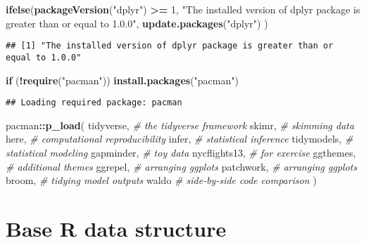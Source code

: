 \documentclass[
]{book}
\newenvironment{Shaded}{\begin{snugshade}}{\end{snugshade}}
\newcommand{\CommentTok}[1]{\textcolor[rgb]{0.56,0.35,0.01}{\textit{#1}}}
\newcommand{\ControlFlowTok}[1]{\textcolor[rgb]{0.13,0.29,0.53}{\textbf{#1}}}
\newcommand{\DecValTok}[1]{\textcolor[rgb]{0.00,0.00,0.81}{#1}}
\newcommand{\KeywordTok}[1]{\textcolor[rgb]{0.13,0.29,0.53}{\textbf{#1}}}
\newcommand{\NormalTok}[1]{#1}
\newcommand{\OperatorTok}[1]{\textcolor[rgb]{0.81,0.36,0.00}{\textbf{#1}}}
\newcommand{\StringTok}[1]{\textcolor[rgb]{0.31,0.60,0.02}{#1}}
\begin{document}
\begin{Shaded}
\begin{Highlighting}[]
\KeywordTok{ifelse}\NormalTok{(}\KeywordTok{packageVersion}\NormalTok{(}\StringTok{"dplyr"}\NormalTok{) }\OperatorTok{\textgreater{}=}\StringTok{ }\DecValTok{1}\NormalTok{,}
  \StringTok{"The installed version of dplyr package is greater than or equal to 1.0.0"}\NormalTok{, }\KeywordTok{update.packages}\NormalTok{(}\StringTok{"dplyr"}\NormalTok{)}
\NormalTok{)}
\end{Highlighting}
\end{Shaded}

\begin{verbatim}
## [1] "The installed version of dplyr package is greater than or equal to 1.0.0"
\end{verbatim}

\begin{Shaded}
\begin{Highlighting}[]
\ControlFlowTok{if}\NormalTok{ (}\OperatorTok{!}\KeywordTok{require}\NormalTok{(}\StringTok{"pacman"}\NormalTok{)) }\KeywordTok{install.packages}\NormalTok{(}\StringTok{"pacman"}\NormalTok{)}
\end{Highlighting}
\end{Shaded}

\begin{verbatim}
## Loading required package: pacman
\end{verbatim}

\begin{Shaded}
\begin{Highlighting}[]
\NormalTok{pacman}\OperatorTok{::}\KeywordTok{p\_load}\NormalTok{(}
\NormalTok{  tidyverse, }\CommentTok{\# the tidyverse framework}
\NormalTok{  skimr, }\CommentTok{\# skimming data}
\NormalTok{  here, }\CommentTok{\# computational reproducibility}
\NormalTok{  infer, }\CommentTok{\# statistical inference}
\NormalTok{  tidymodels, }\CommentTok{\# statistical modeling}
\NormalTok{  gapminder, }\CommentTok{\# toy data}
\NormalTok{  nycflights13, }\CommentTok{\# for exercise}
\NormalTok{  ggthemes, }\CommentTok{\# additional themes}
\NormalTok{  ggrepel, }\CommentTok{\# arranging ggplots}
\NormalTok{  patchwork, }\CommentTok{\# arranging ggplots}
\NormalTok{  broom, }\CommentTok{\# tidying model outputs}
\NormalTok{  waldo }\CommentTok{\# side{-}by{-}side code comparison}
\NormalTok{)}
\end{Highlighting}
\end{Shaded}

\hypertarget{base-r-data-structure}{%
\section{Base R data structure}\label{base-r-data-structure}}
\end{document}

